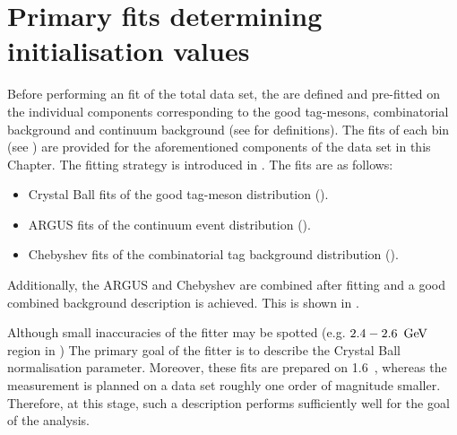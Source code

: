 \chapter{Primary \texorpdfstring{\Mbc}{Mbc} fits determining initialisation values}\label{sec:appendix_primary_fits}
Before performing an \Mbc fit of the total data set, the  are defined and pre-fitted on the individual components corresponding to the good tag-\B mesons, combinatorial \BB background and continuum background (see  for definitions).
The \Mbc fits of each \EB bin (see ) are provided for the aforementioned components of the data set in this Chapter.
The fitting strategy is introduced in .
The fits are as follows:
\begin{itemize}
    \item Crystal Ball \PDF fits of the good tag-\B meson \Mbc distribution ().
    \item ARGUS \PDF fits of the continuum event \Mbc distribution ().
    \item Chebyshev \PDF fits of the combinatorial \BB tag background distribution ().
\end{itemize}
Additionally, the ARGUS and Chebyshev  are combined after fitting and a good combined background description is achieved.
This is shown in  .

Although small inaccuracies of the fitter may be spotted (e.g. $2.4-2.6~\mathrm{\,Ge\kern -0.1em V}$ region in ) The primary goal of the fitter is to describe the Crystal Ball normalisation parameter.
Moreover, these fits are prepared on 1.6~\invab, whereas the measurement is planned on a data set roughly one order of magnitude smaller.
Therefore, at this stage, such a description performs sufficiently well for the goal of the analysis.

